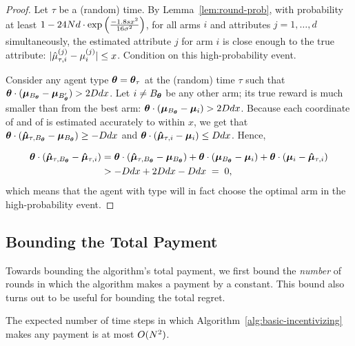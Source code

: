 \begin{proof}
Let $\tau$ be a (random) time.
By Lemma~\ref{lem:round-prob},
with probability at least
$1 - 24 N d \cdot \exp \left( \frac{-1.8 s x^2}{16\sigma^2} \right)$,
for all arms $i$ and attributes $j = 1, \ldots, d$ simultaneously,
the estimated attribute $j$ for arm $i$ is close enough to the true attribute: 
$|\hat{\mu}_{\tau,i}^{(j)} - \mu_{i}^{(j)}| \leq x$.
Condition on this high-probability event.

Consider any agent type $\bm{\theta} = \bm{\theta}_{\tau}$ at the (random) time
$\tau$ such that
$\bm{\theta} \cdot (\bm{\mu}_{B_{\bm{\theta}}} - \bm{\mu}_{B'_{\bm{\theta}}}) > 2D d x$.
Let $i \neq B_{\bm{\theta}}$ be any other arm;
its true reward is much smaller than from the best arm:
$\bm{\theta} \cdot (\bm{\mu}_{B_{\bm{\theta}}} - \bm{\mu}_{i}) > 2D d x$.
Because each coordinate of \ArmEV{\tau}{\Best{\AgV}} and of
 is estimated accurately to within $x$, 
we get that 
$\bm{\theta} \cdot (\bm{\hat{\mu}}_{\tau,B_{\bm{\theta}}} - \bm{\mu}_{B_{\bm{\theta}}})
\geq - D d x$
and
$\bm{\theta} \cdot (\bm{\hat{\mu}}_{\tau,i} - \bm{\mu}_{i}) \leq D d x$.
Hence, 

\begin{align}
\bm{\theta} \cdot (\bm{\hat{\mu}}_{\tau,B_{\bm{\theta}}} - \bm{\hat{\mu}}_{\tau,i})
& =
\bm{\theta} \cdot (\bm{\hat{\mu}}_{\tau,B_{\bm{\theta}}} - \bm{\mu}_{B_{\bm{\theta}}})
+ \bm{\theta} \cdot (\bm{\mu}_{B_{\bm{\theta}}} - \bm{\mu}_{i})
+ \bm{\theta} \cdot (\bm{\mu}_{i} - \bm{\hat{\mu}}_{\tau,i}) \nonumber\\
& > -D d x + 2 D d x - D d x
\; = \; 0, \label{equ:choice}
\end{align}
which means that the agent with type \AgV will in fact choose
the optimal arm in the high-probability event.
\end{proof}

\subsection{Bounding the Total Payment}

Towards bounding the algorithm's total payment, we first bound the
\emph{number} of rounds in which the algorithm makes a payment by a
constant.
This bound also turns out to be useful for bounding the total regret.

\begin{lemma} \label{lem:numP}
The expected number of time steps in which
Algorithm~\ref{alg:basic-incentivizing}
makes any payment is at most $O(N^2)$.
\end{lemma}

